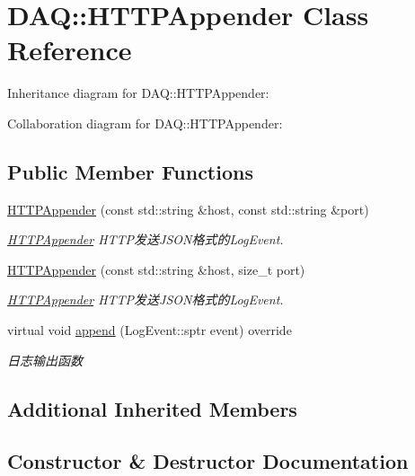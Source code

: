 \hypertarget{classDAQ_1_1HTTPAppender}{}\section{D\+AQ\+:\+:H\+T\+T\+P\+Appender Class Reference}
\label{classDAQ_1_1HTTPAppender}


Inheritance diagram for D\+AQ\+:\+:H\+T\+T\+P\+Appender\+:


Collaboration diagram for D\+AQ\+:\+:H\+T\+T\+P\+Appender\+:
\subsection*{Public Member Functions}
\begin{DoxyCompactItemize}
\item 
\hyperlink{classDAQ_1_1HTTPAppender_aced0b8033fa56caa343fcd7bacf81296}{H\+T\+T\+P\+Appender} (const std\+::string \&host, const std\+::string \&port)
\begin{DoxyCompactList}\small\item\em \hyperlink{classDAQ_1_1HTTPAppender}{H\+T\+T\+P\+Appender} H\+T\+T\+P发送\+J\+S\+O\+N格式的\+Log\+Event. \end{DoxyCompactList}\item 
\hyperlink{classDAQ_1_1HTTPAppender_a43d9c11697616abca51421e118e9c16f}{H\+T\+T\+P\+Appender} (const std\+::string \&host, size\+\_\+t port)
\begin{DoxyCompactList}\small\item\em \hyperlink{classDAQ_1_1HTTPAppender}{H\+T\+T\+P\+Appender} H\+T\+T\+P发送\+J\+S\+O\+N格式的\+Log\+Event. \end{DoxyCompactList}\item 
virtual void \hyperlink{classDAQ_1_1HTTPAppender_a2648d6d4328aea4d6d19ca05677fda1c}{append} (Log\+Event\+::sptr event) override
\begin{DoxyCompactList}\small\item\em 日志输出函数 \end{DoxyCompactList}\end{DoxyCompactItemize}
\subsection*{Additional Inherited Members}


\subsection{Constructor \& Destructor Documentation}
\mbox{\label{classDAQ_1_1HTTPAppender_aced0b8033fa56caa343fcd7bacf81296}} 

